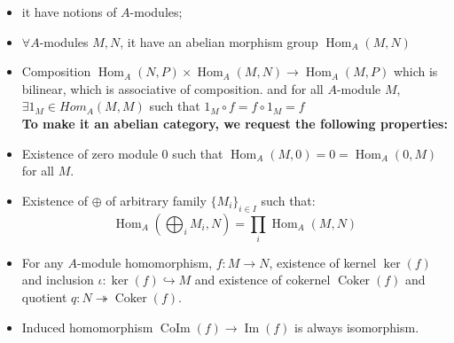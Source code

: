 \documentclass[12pt]{article}
\theoremstyle{definition}
\theoremstyle{plain}
\DeclareMathOperator{\im}{Im}
\DeclareMathOperator{\Hom}{Hom}
\DeclareMathOperator{\Coker}{Coker}
\DeclareMathOperator{\CoIm}{CoIm}
\begin{document}
\begin{itemize}
  \item it have notions of $A$-modules;
  \item $\forall A$-modules $M, N$, it have an abelian morphism group $\Hom_A(M, N)$
  \item Composition $\Hom_A(N, P)\times \Hom_A(M, N)\to \Hom_A(M, P)$ which is bilinear, which is associative of composition. and for all $A$-module $M$, $\exists 1_M\in Hom_A(M, M)$ such that $1_M\circ f= f\circ 1_M=f$\\
  \textbf{To make it an abelian category, we request the following properties:}
  \item Existence of zero module 0 such that $\Hom_A(M, 0)=0=\Hom_A(0, M)$ for all $M$.
  \item Existence of $\oplus$ of arbitrary family $\{M_i\}_{i\in I}$ such that: $$\Hom_A(\bigoplus_iM_i, N)=\prod_i\Hom_A(M, N)$$
  \item For any $A$-module homomorphism, $f:M\to N$, existence of kernel $\ker(f)$ and inclusion $\iota: \ker(f)\hookrightarrow M$ and existence of cokernel $\Coker(f)$ and quotient $q:N\twoheadrightarrow \Coker(f)$.
  \item Induced homomorphism $\CoIm(f)\to \im(f)$ is always isomorphism.
\end{itemize}
\end{document}
